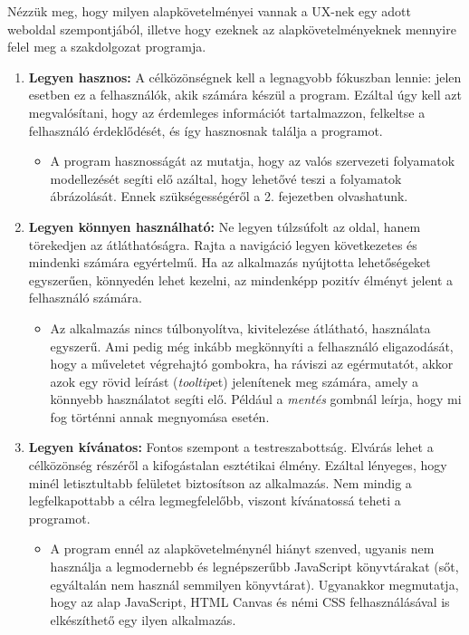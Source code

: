 
Nézzük meg, hogy milyen alapkövetelményei vannak a UX-nek egy adott weboldal szempontjából, illetve hogy ezeknek az alapkövetelményeknek mennyire felel meg a szakdolgozat programja.

\begin{enumerate}
\item \textbf{Legyen hasznos:} A célközönségnek kell a legnagyobb fókuszban lennie: jelen esetben ez a felhasználók, akik számára készül a program. Ezáltal úgy kell azt megvalósítani, hogy az érdemleges információt tartalmazzon, felkeltse a felhasználó érdeklődését, és így hasznosnak találja a programot.

\begin{itemize}
\item A program hasznosságát az mutatja, hogy az valós szervezeti folyamatok modellezését segíti elő azáltal, hogy lehetővé teszi a folyamatok ábrázolását. Ennek szükségességéről a 2. fejezetben olvashatunk.
\end{itemize}

\item \textbf{Legyen könnyen használható:} Ne legyen túlzsúfolt az oldal, hanem törekedjen az átláthatóságra. Rajta a navigáció legyen következetes és mindenki számára egyértelmű. Ha az alkalmazás nyújtotta lehetőségeket egyszerűen, könnyedén lehet kezelni, az mindenképp pozitív élményt jelent a felhasználó számára.

\begin{itemize}
\item Az alkalmazás nincs túlbonyolítva, kivitelezése átlátható, használata egyszerű. Ami pedig még inkább megkönnyíti a felhasználó eligazodását, hogy a műveletet végrehajtó gombokra, ha ráviszi az egérmutatót, akkor azok egy rövid leírást (\textit{tooltip}et) jelenítenek meg számára, amely a könnyebb használatot segíti elő. Például a \textit{mentés} gombnál leírja, hogy mi fog történni annak megnyomása esetén.
\end{itemize}
\item \textbf{Legyen kívánatos:} Fontos szempont a testreszabottság. Elvárás lehet a célközönség részéről a kifogástalan esztétikai élmény. Ezáltal lényeges, hogy minél letisztultabb felületet biztosítson az alkalmazás. Nem mindig a legfelkapottabb a célra legmegfelelőbb, viszont kívánatossá teheti a programot.

\begin{itemize}
\item A program ennél az alapkövetelménynél hiányt szenved, ugyanis nem használja a legmodernebb és legnépszerűbb JavaScript könyvtárakat (sőt, egyáltalán nem használ semmilyen könyvtárat). Ugyanakkor megmutatja, hogy az alap JavaScript, HTML Canvas és némi CSS felhasználásával is elkészíthető egy ilyen alkalmazás.
\end{itemize}


\end{enumerate}
